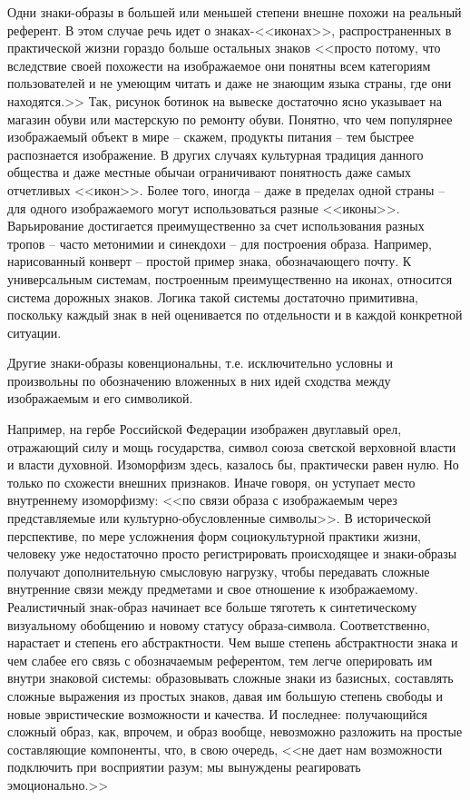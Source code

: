 Одни знаки-образы в большей или меньшей степени внешне похожи на реальный референт.
В этом случае речь идет о знаках-<<иконах>>, распространенных в практической жизни
гораздо больше остальных знаков <<просто потому, что вследствие своей похожести на
изображаемое они понятны всем категориям пользователей и не умеющим читать и даже
не знающим языка страны, где они находятся.>> \autocite[][55]{solomonik1995}
Так, рисунок ботинок на вывеске достаточно ясно указывает на магазин обуви или мастерскую по
ремонту обуви. Понятно, что чем популярнее изображаемый объект в мире -- скажем,
продукты питания -- тем быстрее распознается изображение. В других случаях культурная
традиция данного общества и даже местные обычаи ограничивают понятность даже
самых отчетливых <<икон>>. Более того, иногда -- даже в пределах одной страны -- для
одного изображаемого могут использоваться разные <<иконы>>. Варьирование достигается
преимущественно за счет использования разных тропов -- часто метонимии и синекдохи --
для построения образа. Например, нарисованный конверт -- простой пример знака, обозначающего почту.
К универсальным системам, построенным преимущественно на иконах, относится система
дорожных знаков. \autocite[][56-58]{solomonik1995} Логика такой системы достаточно
примитивна, поскольку каждый знак в ней оценивается по отдельности и в каждой
конкретной ситуации.

Другие знаки-образы ковенциональны, т.е. исключительно условны и произвольны
по обозначению вложенных в них идей сходства между изображаемым и его символикой.

Например, на гербе Российской Федерации изображен двуглавый орел,
отражающий силу и мощь государства, символ союза светской верховной власти  и власти духовной.
Изоморфизм здесь, казалось бы, практически равен нулю. Но только по
схожести внешних признаков. Иначе говоря, он уступает место внутреннему изоморфизму:
<<по связи образа с изображаемым через представляемые или культурно-обусловленные
символы>>. \autocite[][61]{solomonik1995} В исторической перспективе, по мере
усложнения форм социокультурной практики жизни, человеку уже недостаточно просто
регистрировать происходящее и знаки-образы получают дополнительную смысловую нагрузку,
чтобы передавать сложные внутренние связи между предметами и свое отношение к изображаемому.
Реалистичный знак-образ начинает все больше тяготеть к синтетическому визуальному обобщению
и новому статусу образа-символа. Соответственно, нарастает и степень его абстрактности.
Чем выше степень абстрактности знака и чем слабее его связь с обозначаемым
референтом, тем легче оперировать им внутри знаковой системы: образовывать
сложные знаки из базисных, составлять сложные выражения из простых знаков, давая
им большую степень свободы и новые эвристические возможности и качества.
И последнее: получающийся сложный образ, как,  впрочем,  и образ вообще, невозможно
разложить на простые составляющие компоненты, что, в свою очередь, <<не дает нам
возможности подключить при восприятии разум; мы вынуждены реагировать
эмоционально.>> \autocite[][77]{solomonik1995}


